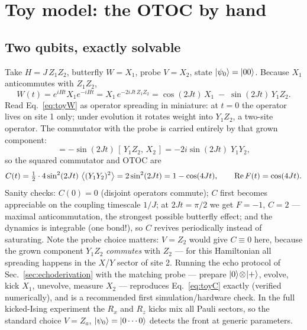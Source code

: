 \documentclass[11pt]{article}
\begin{document}
\section{Toy model: the OTOC by hand}
\label{sec:toy}

\subsection{Two qubits, exactly solvable}

Take $H = J\, Z_1 Z_2$, butterfly $W=X_1$, probe $V=X_2$, state
$\ket{\psi_0}=\ket{00}$. Because $X_1$ anticommutes with $Z_1Z_2$,
\begin{equation}
  W(t) = e^{iHt} X_1 e^{-iHt}
       = X_1\, e^{-2iJt\, Z_1Z_2}
       = \cos(2Jt)\, X_1 \;-\; \sin(2Jt)\, Y_1 Z_2 .
  \label{eq:toyW}
\end{equation}
Read Eq.~\eqref{eq:toyW} as operator spreading in miniature: at $t=0$ the
operator lives on site 1 only; under evolution it rotates weight into
$Y_1Z_2$, a two-site operator. The commutator with the probe is carried
entirely by that grown component:
\begin{equation}
  [\,W(t), X_2\,] = -\sin(2Jt)\,[\,Y_1Z_2,\,X_2\,]
                  = -2i\sin(2Jt)\; Y_1 Y_2 ,
\end{equation}
so the squared commutator and OTOC are
\begin{equation}
  C(t) = \tfrac12 \cdot 4\sin^2(2Jt)\,\expval{(Y_1Y_2)^2} = 2\sin^2(2Jt)
       = 1 - \cos(4Jt),
  \qquad
  \mathrm{Re}\,F(t) = \cos(4Jt).
  \label{eq:toyC}
\end{equation}
Sanity checks: $C(0)=0$ (disjoint operators commute); $C$ first becomes
appreciable on the coupling timescale $1/J$; at $2Jt=\pi/2$ we get $F=-1$,
$C=2$ --- maximal anticommutation, the strongest possible butterfly effect;
and the dynamics is integrable (one bond!), so $C$ revives periodically
instead of saturating. Note the probe choice matters: $V=Z_2$ would give
$C\equiv0$ here, because the grown component $Y_1Z_2$ \emph{commutes} with
$Z_2$ --- for this Hamiltonian all spreading happens in the $X$/$Y$ sector
of site 2. Running the echo protocol of Sec.~\ref{sec:echoderivation} with
the matching probe --- prepare $\ket{0}\!\otimes\!\ket{+}$, evolve, kick
$X_1$, unevolve, measure $X_2$ --- reproduces Eq.~\eqref{eq:toyC} exactly
(verified numerically), and is a recommended first simulation/hardware
check. In the full kicked-Ising experiment the $R_x$ and $R_z$ kicks mix all
Pauli sectors, so the standard choice $V=Z_a$, $\ket{\psi_0}=\ket{0\cdots0}$
detects the front at generic parameters.
\end{document}
